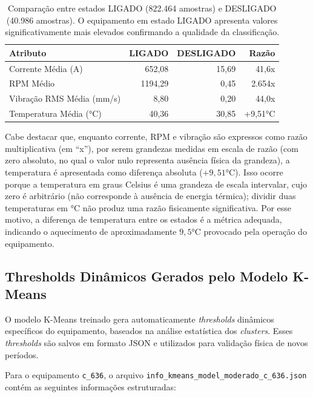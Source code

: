 \begin{table}[H]
  \centering
  \small
  \begin{tabular}{|l|r|r|r|}
    \hline
    \textbf{Atributo}         & \textbf{LIGADO} & \textbf{DESLIGADO} & \textbf{Razão} \\
    \hline
    Corrente Média (A)        & 652,08          & 15,69              & 41,6x          \\
    RPM Médio                 & 1194,29         & 0,45               & 2.654x         \\
    Vibração RMS Média (mm/s) & 8,80            & 0,20               & 44,0x          \\
    Temperatura Média (°C)    & 40,36           & 30,85              & +9,51°C        \\
    \hline
  \end{tabular}
  \caption{Comparação entre estados LIGADO (822.464 amostras) e DESLIGADO (40.986 amostras). O equipamento em estado LIGADO apresenta valores significativamente mais elevados confirmando a qualidade da classificação.}
  \label{tab:comparacao_ligado_desligado}
\end{table}

Cabe destacar que, enquanto corrente, RPM e vibração são expressos como razão multiplicativa (em ``x''), por serem grandezas medidas em escala de razão (com zero absoluto, no qual o valor nulo representa ausência física da grandeza), a temperatura é apresentada como diferença absoluta ($+9{,}51$°C). Isso ocorre porque a temperatura em graus Celsius é uma grandeza de escala intervalar, cujo zero é arbitrário (não corresponde à ausência de energia térmica); dividir duas temperaturas em °C não produz uma razão fisicamente significativa. Por esse motivo, a diferença de temperatura entre os estados é a métrica adequada, indicando o aquecimento de aproximadamente $9{,}5$°C provocado pela operação do equipamento.

\subsection{Thresholds Dinâmicos Gerados pelo Modelo K-Means}

O modelo K-Means treinado gera automaticamente \textit{thresholds} dinâmicos específicos do equipamento, baseados na análise estatística dos \textit{clusters}. Esses \textit{thresholds} são salvos em formato JSON e utilizados para validação física de novos períodos.

Para o equipamento \texttt{c\_636}, o arquivo \texttt{info\_kmeans\_model\_moderado\_c\_636.json} contém as seguintes informações estruturadas:


